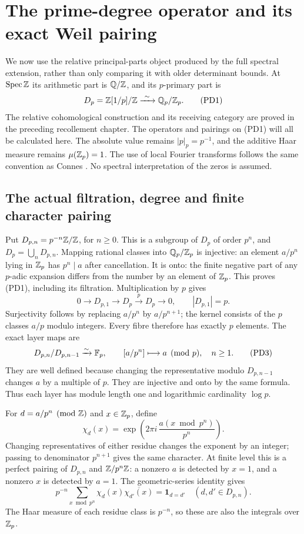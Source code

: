 \section{The prime-degree operator and its exact Weil pairing}
\label{sec:relative-prime-degree}
We now use the relative principal-parts object produced by the full
spectral extension, rather than only comparing it with older determinant
bounds. At $\operatorname{Spec}\mathbb Z$ its arithmetic part is $\mathbb Q/\mathbb Z$, and its $p$-primary
part is
\[
 D_p=\Z[1/p]/\Z\xrightarrow{\ \sim\ }\Q_p/\Z_p.
 \tag{PD1}
\]
The relative cohomological construction and its receiving category are
proved in the preceding recollement chapter. The operators and pairings
on (PD1) will all be calculated here. The absolute value remains
$|p|_p=p^{-1}$, and the additive Haar measure remains $\mu(\mathbb Z_p)=1$.
The use of local Fourier transforms follows the same convention as
Connes \cite[Section III]{Connes1998}. No spectral interpretation of the
zeros is assumed.

\subsection{The actual filtration, degree and finite character pairing}
Put $D_{p,n}=p^{-n}\mathbb Z/\mathbb Z$, for $n\ge0$. This is a subgroup of
$D_p$ of order $p^n$, and $D_p=\bigcup_nD_{p,n}$. Mapping rational
classes into $\mathbb Q_p/\mathbb Z_p$ is injective: an element $a/p^n$ lying in
$\mathbb Z_p$ has $p^n\mid a$ after cancellation. It is onto: the finite
negative part of any $p$-adic expansion differs from the number by an
element of $\mathbb Z_p$. This proves (PD1), including its filtration.
Multiplication by $p$ gives
\[
 0\longrightarrow D_{p,1}\longrightarrow D_p
 \xrightarrow{p}D_p\longrightarrow0,
 \qquad |D_{p,1}|=p.
 \tag{PD2}
\]
Surjectivity follows by replacing $a/p^n$ by $a/p^{n+1}$; the kernel
consists of the $p$ classes $a/p$ modulo integers. Every fibre therefore
has exactly $p$ elements. The exact layer maps are
\[
 D_{p,n}/D_{p,n-1}\xrightarrow{\sim}\mathbb F_p,
 \qquad [a/p^n]\longmapsto a\pmod p,\quad n\ge1.
 \tag{PD3}
\]
They are well defined because changing the representative modulo
$D_{p,n-1}$ changes $a$ by a multiple of $p$. They are injective and
onto by the same formula. Thus each layer has module length one and
logarithmic cardinality $\log p$.

For $d=a/p^n\pmod{\mathbb Z}$ and $x\in\mathbb Z_p$, define
\[
 \chi_d(x)=\exp\left(2\pi i\,\frac{a(x\bmod p^n)}{p^n}\right).
 \tag{PD4}
\]
Changing representatives of either residue changes the exponent by an
integer; passing to denominator $p^{n+1}$ gives the same character.
At finite level this is a perfect pairing of $D_{p,n}$ and
$\mathbb Z/p^n\mathbb Z$: a nonzero $a$ is detected by $x=1$, and a nonzero $x$
is detected by $a=1$. The geometric-series identity gives
\[
 p^{-n}\sum_{x\bmod p^n}\chi_d(x)\overline{\chi_{d'}(x)}
 =\mathbf1_{d=d'}\quad(d,d'\in D_{p,n}).
 \tag{PD5}
\]
The Haar measure of each residue class is $p^{-n}$, so these are also
the integrals over $\mathbb Z_p$.

